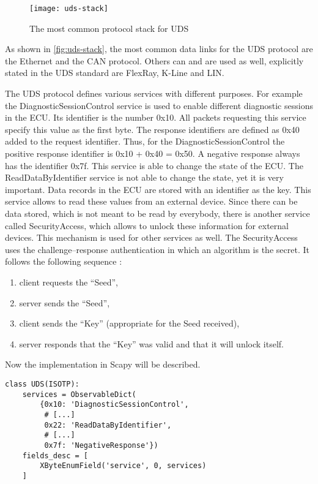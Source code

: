 \begin{figure}[h]
    \centering
    \texttt{[image: uds-stack]}
    \caption{The most common protocol stack for UDS \cite{Weiss2020}}
    \label{fig:uds-stack}
\end{figure}

As shown in \autoref{fig:uds-stack}, the most common data links for the UDS protocol are the Ethernet and the CAN protocol. Others can and are used as well, explicitly stated in the UDS standard are FlexRay, K-Line and LIN.

The UDS protocol defines various services with different purposes. For example the DiagnosticSessionControl service is used to enable different diagnostic sessions in the ECU. Its identifier is the number 0x10. All packets requesting this service specify this value as the first byte. The response identifiers are defined as 0x40 added to the request identifier. Thus, for the DiagnosticSessionControl the positive response identifier is 0x10 + 0x40 = 0x50. A negative response always has the identifier 0x7f. This service is able to change the state of the ECU. The ReadDataByIdentifier service is not able to change the state, yet it is very important. Data records in the ECU are stored with an identifier as the key. This service allows to read these values from an external device. Since there can be data stored, which is not meant to be read by everybody, there is another service called SecurityAccess, which allows to unlock these information for external devices. This mechanism is used for other services as well. The SecurityAccess uses the challenge–response authentication in which an algorithm is the secret. It follows the following sequence \cite{iso14229}:

\begin{samepage}
\begin{enumerate}
  \item client requests the “Seed”,
  \item server sends the “Seed”,
  \item client sends the “Key” (appropriate for the Seed received),
  \item server responds that the “Key” was valid and that it will unlock itself.
\end{enumerate}
\end{samepage}

Now the implementation in Scapy will be described.

\begin{samepage}
\begin{verbatim}
class UDS(ISOTP):
    services = ObservableDict(
        {0x10: 'DiagnosticSessionControl',
         # [...]
         0x22: 'ReadDataByIdentifier',
         # [...]
         0x7f: 'NegativeResponse'})
    fields_desc = [
        XByteEnumField('service', 0, services)
    ]
\end{verbatim}
\end{samepage}

